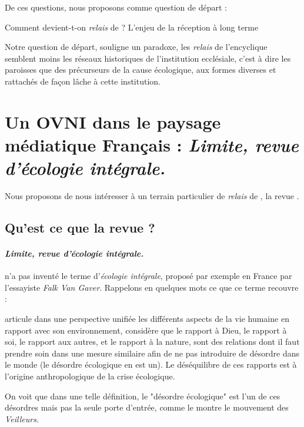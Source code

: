 De ces questions, nous proposons comme question de départ : 
\begin{singlequote}
     Comment devient-t-on \textit{relais} de \LS ? L'enjeu de la réception à long terme
\end{singlequote}

Notre question de départ, souligne un paradoxe, les \textit{relais} de l'encyclique semblent moins les réseaux historiques de l'institution ecclésiale, c'est à dire les paroisses que des précurseurs de la cause écologique, aux formes diverses et rattachés de façon lâche à cette institution. 



 


   
   

\section{Un OVNI dans le paysage médiatique Français  : \textit{Limite, revue d'écologie intégrale.}}


Nous proposons de nous intéresser à un terrain particulier de \textit{relais} de \LS, la revue \RLimite. 

\subsection{Qu'est ce que la revue \RLimite ?}
\paragraph{\textit{Limite, revue d'écologie intégrale.}}
 \LS n'a pas inventé le terme d’\textit{écologie intégrale}, proposé par exemple en France par l'essayiste \textit{Falk Van Gaver}. 
Rappelons en quelques mots ce que ce terme recouvre : 
\begin{singlequote}
     articule dans une perspective unifiée les différents aspects de la vie humaine en rapport avec son environnement, considère que le rapport à Dieu, le rapport à soi, le rapport aux autres, et le rapport à la nature, sont des relations dont il faut prendre soin dans une mesure similaire afin de ne pas introduire de désordre dans le monde (le désordre écologique en est un). Le déséquilibre de ces rapports est à l’origine anthropologique de la crise écologique.\cite{revol_lencyclique_2016}
\end{singlequote}
On voit que dans une telle définition, le "désordre écologique" est l'un de ces désordres mais pas la seule porte d'entrée, comme le montre le mouvement des \textit{Veilleurs}.


